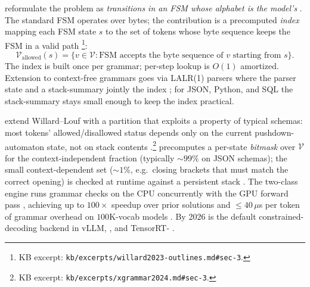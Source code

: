 \citet{willard2023-outlines} reformulate the problem as
\emph{transitions in an FSM whose alphabet is the model's }.
The standard FSM operates over bytes; the contribution is a
precomputed \emph{index} mapping each FSM state $s$ to the set of
 tokens whose byte sequence keeps the FSM in a valid path
\citep[\S 3]{willard2023-outlines}\footnote{KB excerpt:
\nolinkurl{kb/excerpts/willard2023-outlines.md#sec-3}.}:
\begin{equation}
\mathcal{V}_{\text{allowed}}(s) = \{v \in \mathcal{V} : \mathrm{FSM} \text{ accepts the byte sequence of } v \text{ starting from } s\}.
\label{eq:outlines-index}
\end{equation}
The index is built once per grammar; per-step lookup is $O(1)$
amortized. Extension to context-free grammars goes via LALR(1) parsers
where the parser state and a stack-summary jointly  the index
\citep[\S 4]{willard2023-outlines}; for JSON, Python, and SQL the
stack-summary stays small enough to keep the index practical.

\citet{xgrammar2024} extend Willard--Louf with a partition that
exploits a property of typical schemas: most  tokens'
allowed/disallowed status depends only on the current pushdown-automaton
state, not on stack contents \citep[\S 3]{xgrammar2024}.\footnote{KB
excerpt: \nolinkurl{kb/excerpts/xgrammar2024.md#sec-3}.} 
precomputes a per-state \emph{bitmask} over $\mathcal{V}$ for the
context-independent fraction (typically $\sim 99\%$ on JSON schemas);
the small context-dependent set ($\sim 1\%$, e.g.\ closing brackets
that must match the correct opening) is checked at runtime against a
persistent stack \citep[\S 4--5]{xgrammar2024}. The two-class engine
runs grammar checks on the CPU concurrently with the GPU forward pass
\citep[\S 6]{xgrammar2024}, achieving up to $100\times$ speedup over
prior solutions and $\leq 40\,\mu$s per token of grammar overhead on
$100$K-vocab models \citep[\S 7]{xgrammar2024}. By 2026  is
the default constrained-decoding backend in vLLM, , and
TensorRT- \citep[FORUM-SIGNAL]{xgrammar2024}.

